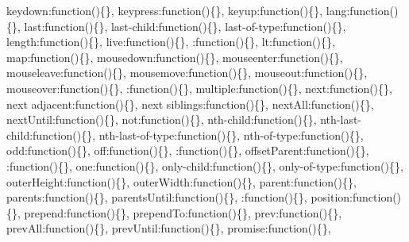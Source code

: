 {\begin{DoxyParamCaption}
\textquotesingle{}keydown\textquotesingle{}\+:function()\{\}, \textquotesingle{}keypress\textquotesingle{}\+:function()\{\}, \textquotesingle{}keyup\textquotesingle{}\+:function()\{\}, \textquotesingle{}lang\textquotesingle{}\+:function()\{\}, \textquotesingle{}last\textquotesingle{}\+:function()\{\}, \textquotesingle{}last-\/child\textquotesingle{}\+:function()\{\}, \textquotesingle{}last-\/of-\/type\textquotesingle{}\+:function()\{\}, \textquotesingle{}length\textquotesingle{}\+:function()\{\}, \textquotesingle{}live\textquotesingle{}\+:function()\{\}, \textquotesingle{}\+:function()\{\}, \textquotesingle{}lt\textquotesingle{}\+:function()\{\}, \textquotesingle{}map\textquotesingle{}\+:function()\{\}, \textquotesingle{}mousedown\textquotesingle{}\+:function()\{\}, \textquotesingle{}mouseenter\textquotesingle{}\+:function()\{\}, \textquotesingle{}mouseleave\textquotesingle{}\+:function()\{\}, \textquotesingle{}mousemove\textquotesingle{}\+:function()\{\}, \textquotesingle{}mouseout\textquotesingle{}\+:function()\{\}, \textquotesingle{}mouseover\textquotesingle{}\+:function()\{\}, \textquotesingle{}\+:function()\{\}, \textquotesingle{}multiple\textquotesingle{}\+:function()\{\}, \textquotesingle{}next\textquotesingle{}\+:function()\{\}, \textquotesingle{}next adjacent\textquotesingle{}\+:function()\{\}, \textquotesingle{}next siblings\textquotesingle{}\+:function()\{\}, \textquotesingle{}next\+All\textquotesingle{}\+:function()\{\}, \textquotesingle{}next\+Until\textquotesingle{}\+:function()\{\}, \textquotesingle{}not\textquotesingle{}\+:function()\{\}, \textquotesingle{}nth-\/child\textquotesingle{}\+:function()\{\}, \textquotesingle{}nth-\/last-\/child\textquotesingle{}\+:function()\{\}, \textquotesingle{}nth-\/last-\/of-\/type\textquotesingle{}\+:function()\{\}, \textquotesingle{}nth-\/of-\/type\textquotesingle{}\+:function()\{\}, \textquotesingle{}odd\textquotesingle{}\+:function()\{\}, \textquotesingle{}off\textquotesingle{}\+:function()\{\}, \textquotesingle{}\+:function()\{\}, \textquotesingle{}offset\+Parent\textquotesingle{}\+:function()\{\}, \textquotesingle{}\+:function()\{\}, \textquotesingle{}one\textquotesingle{}\+:function()\{\}, \textquotesingle{}only-\/child\textquotesingle{}\+:function()\{\}, \textquotesingle{}only-\/of-\/type\textquotesingle{}\+:function()\{\}, \textquotesingle{}outer\+Height\textquotesingle{}\+:function()\{\}, \textquotesingle{}outer\+Width\textquotesingle{}\+:function()\{\}, \textquotesingle{}parent\textquotesingle{}\+:function()\{\}, \textquotesingle{}parents\textquotesingle{}\+:function()\{\}, \textquotesingle{}parents\+Until\textquotesingle{}\+:function()\{\}, \textquotesingle{}\+:function()\{\}, \textquotesingle{}position\textquotesingle{}\+:function()\{\}, \textquotesingle{}prepend\textquotesingle{}\+:function()\{\}, \textquotesingle{}prepend\+To\textquotesingle{}\+:function()\{\}, \textquotesingle{}prev\textquotesingle{}\+:function()\{\}, \textquotesingle{}prev\+All\textquotesingle{}\+:function()\{\}, \textquotesingle{}prev\+Until\textquotesingle{}\+:function()\{\}, \textquotesingle{}promise\textquotesingle{}\+:function()\{\}, 
\end{DoxyParamCaption}}
